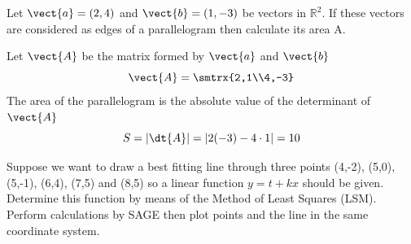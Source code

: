 \begin{exercise}
Let $\vect{a}=(2,4)$ and $\vect{b}=(1,-3)$ be vectors in $\mathbb{R}^2$. If these vectors are considered as edges of a parallelogram then calculate its area A. 
\end{exercise}

\begin{solution}
Let $\vect{A}$ be the matrix formed by $\vect{a}$ and $\vect{b}$
\[ \vect{A}=\smtrx{2,1\\4,-3} \]
The area of the parallelogram is the absolute value of the determinant of $\vect{A}$
\[ S=\vert \dt{A}\vert = \vert 2(-3)-4\cdot 1 \vert =10 \]
\end{solution}

\begin{exercise}
Suppose we want to draw a best fitting line through three points (4,-2), (5,0), (5,-1), (6,4), (7,5) and (8,5) so a linear function $y=t+kx$ should be given. Determine this function by means of the Method of Least Squares (LSM). Perform calculations by SAGE then plot points and the line in the same coordinate system.
\end{exercise}

